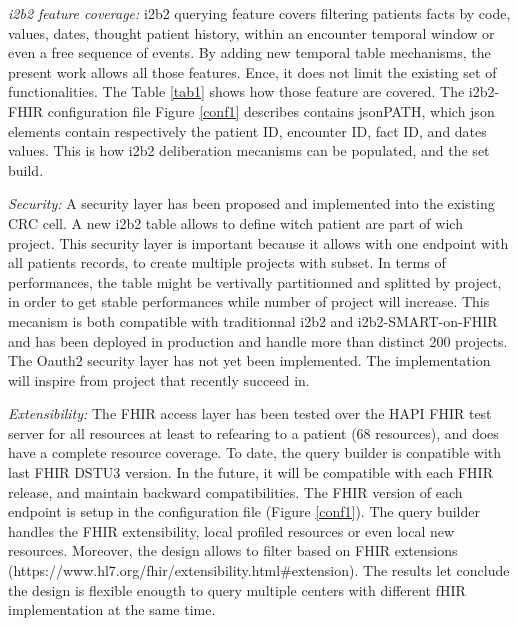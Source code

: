 \documentclass{amia}
\begin{document}
\textit{i2b2 feature coverage: }i2b2 querying feature covers filtering patients facts by code, values, dates, thought patient history, within an encounter temporal window or even a free sequence of events. By adding new temporal table mechanisms, the present work allows all those features. Ence, it does not limit the existing set of functionalities. The Table \ref{tab1} shows how those feature are covered. The i2b2-FHIR configuration file Figure \ref{conf1} describes contains jsonPATH, which json elements contain respectively the patient ID, encounter ID, fact ID, and dates values. This is how i2b2 deliberation mecanisms can be populated, and the set build.

\textit{Security: }A security layer has been proposed and implemented into the existing CRC cell. A new i2b2 table allows to define witch patient are part of wich project. This security layer is important because it allows with one endpoint with all patients records, to create multiple projects with subset. In terms of performances, the table might be vertivally partitionned and splitted by project, in order to get stable performances while number of project will increase. This mecanism is both compatible with traditionnal i2b2 and i2b2-SMART-on-FHIR and has been deployed in production and handle more than distinct 200 projects.
The Oauth2 security layer has not yet been implemented. The implementation will inspire from project\cite{ref2,ref3} that recently succeed in.

\textit{Extensibility:} The FHIR access layer has been tested over the HAPI FHIR test server for all resources at least to refearing to a patient (68 resources), and does have a complete resource coverage. To date, the query builder is conpatible with last FHIR DSTU3 version. In the future, it will be compatible with each FHIR release, and maintain backward compatibilities. The FHIR version of each endpoint is setup in the configuration file (Figure \ref{conf1}). The query builder handles the FHIR extensibility, local profiled resources or even local new resources. Moreover, the design allows to filter based on FHIR extensions (https://www.hl7.org/fhir/extensibility.html\#extension). The results let conclude the design is flexible enougth to query multiple centers with different fHIR implementation at the same time.
\end{document}

